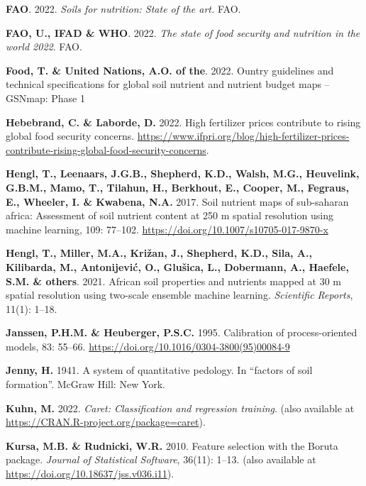 \documentclass[
  10pt,
  b5paper,
  oneside]{book}
\newlength{\cslhangindent}
\newlength{\cslentryspacingunit} %
\newenvironment{CSLReferences}[2] %
 {%
  \setlength{\parindent}{0pt}
  \ifodd #1
  \let\oldpar\par
  \def\par{\hangindent=\cslhangindent\oldpar}
  \fi
  \setlength{\parskip}{#2\cslentryspacingunit}
 }%
 {}
\begin{document}
\begin{CSLReferences}{0}{0}
\leavevmode{}%
\textbf{FAO}. 2022. \emph{Soils for nutrition: State of the art.} FAO.

\leavevmode{}%
\textbf{FAO, U., IFAD \& WHO}. 2022. \emph{The state of food security and nutrition in the world 2022}. FAO.

\leavevmode{}%
\textbf{Food, T. \& United Nations, A.O. of the}. 2022. Ountry guidelines and technical specifications for global soil nutrient and nutrient budget maps -- GSNmap: Phase 1

\leavevmode{}%
\textbf{Hebebrand, C. \& Laborde, D.} 2022. High fertilizer prices contribute to rising global food security concerns. \url{https://www.ifpri.org/blog/high-fertilizer-prices-contribute-rising-global-food-security-concerns}.

\leavevmode{}%
\textbf{Hengl, T., Leenaars, J.G.B., Shepherd, K.D., Walsh, M.G., Heuvelink, G.B.M., Mamo, T., Tilahun, H., Berkhout, E., Cooper, M., Fegraus, E., Wheeler, I. \& Kwabena, N.A.} 2017. Soil nutrient maps of sub-saharan africa: Assessment of soil nutrient content at 250 m spatial resolution using machine learning, 109: 77--102. \url{https://doi.org/10.1007/s10705-017-9870-x}

\leavevmode{}%
\textbf{Hengl, T., Miller, M.A., Križan, J., Shepherd, K.D., Sila, A., Kilibarda, M., Antonijević, O., Glušica, L., Dobermann, A., Haefele, S.M. \& others}. 2021. African soil properties and nutrients mapped at 30 m spatial resolution using two-scale ensemble machine learning. \emph{Scientific Reports}, 11(1): 1--18.

\leavevmode{}%
\textbf{Janssen, P.H.M. \& Heuberger, P.S.C.} 1995. Calibration of process-oriented models, 83: 55--66. \url{https://doi.org/10.1016/0304-3800(95)00084-9}

\leavevmode{}%
\textbf{Jenny, H.} 1941. A system of quantitative pedology. In {``factors of soil formation''}. McGraw Hill: New York.

\leavevmode{}%
\textbf{Kuhn, M.} 2022. \emph{Caret: Classification and regression training}. (also available at \url{https://CRAN.R-project.org/package=caret}).

\leavevmode{}%
\textbf{Kursa, M.B. \& Rudnicki, W.R.} 2010. Feature selection with the {Boruta} package. \emph{Journal of Statistical Software}, 36(11): 1--13. (also available at \url{https://doi.org/10.18637/jss.v036.i11}).


\end{CSLReferences}
\end{document}
